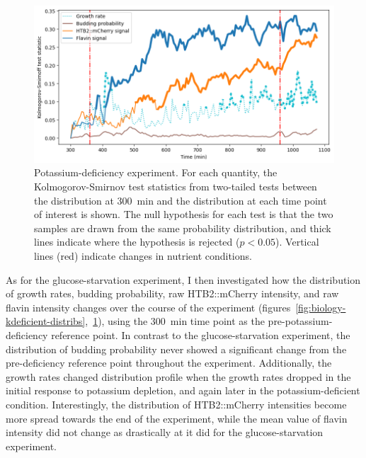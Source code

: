 \begin{figure}
  \centering
  \includegraphics[width=\textwidth]{613_ks_highlight}
  \caption{
    Potassium-deficiency experiment.
    For each quantity, the Kolmogorov-Smirnov test statistics from two-tailed tests between the distribution at \SI{300}{\minute} and the distribution at each time point of interest is shown.
    The null hypothesis for each test is that the two samples are drawn from the same probability distribution, and thick lines indicate where the hypothesis is rejected ($p < 0.05$).
    Vertical lines (red) indicate changes in nutrient conditions.
  }
  \label{fig:biology-kdeficient-ks}
\end{figure}

As for the glucose-starvation experiment, I then investigated how the distribution of growth rates, budding probability, raw HTB2::mCherry intensity, and raw flavin intensity changes over the course of the experiment (figures~\ref{fig:biology-kdeficient-distribs},~\ref{fig:biology-kdeficient-ks}), using the \SI{300}{\minute} time point as the pre-potassium-deficiency reference point.
In contrast to the glucose-starvation experiment, the distribution of budding probability never showed a significant change from the pre-deficiency reference point throughout the experiment.
Additionally, the growth rates changed distribution profile when the growth rates dropped in the initial response to potassium depletion, and again later in the potassium-deficient condition.
Interestingly, the distribution of HTB2::mCherry intensities become more spread towards the end of the experiment, while the mean value of flavin intensity did not change as drastically at it did for the glucose-starvation experiment.





